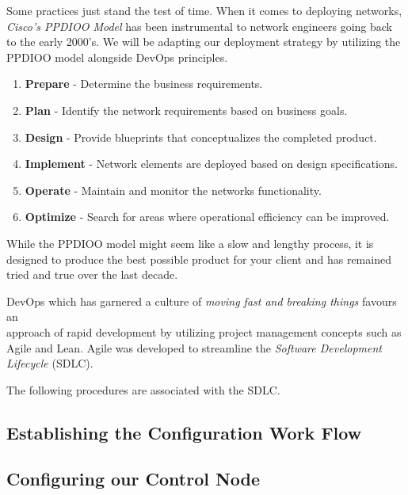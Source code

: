 \documentclass[12pt, letterpaper]{article}
\begin{document}
Some practices just stand the test of time. When it comes to deploying networks, \textit{Cisco's PPDIOO Model} has been instrumental to network engineers going back to the early 2000's. We will be adapting our deployment strategy by utilizing the PPDIOO model alongside DevOps principles.

\smallskip

\begin{enumerate}
\item \textbf{Prepare} - Determine the business requirements.
\item \textbf{Plan} - Identify the network requirements based on business goals.
\item \textbf{Design} - Provide blueprints that conceptualizes the completed product.
\item \textbf{Implement} - Network elements are deployed based on design specifications.
\item \textbf{Operate} - Maintain and monitor the networks functionality.
\item \textbf{Optimize} - Search for areas where operational efficiency can be improved.
\end{enumerate}

\smallskip

While the PPDIOO model might seem like a slow and lengthy process, it is designed to produce the best possible product for your client and has remained tried and true over the last decade. 

\smallskip

DevOps which has garnered a culture of \textit{moving fast and breaking things} favours an \\ approach of rapid development by utilizing project management concepts such as \\ Agile and Lean. Agile was developed to streamline the \textit{Software Development Lifecycle} (SDLC).

The following procedures are associated with the SDLC.


	\subsection{Establishing the Configuration Work Flow}

	\subsection{Configuring our Control Node}
		
		
\end{document}
